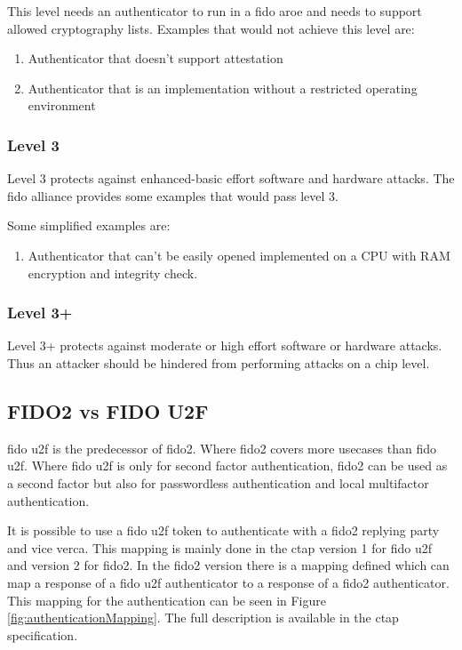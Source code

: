 \documentclass[a4paper, 11pt]{scrartcl}
\begin{document}
This level needs an authenticator to run in a \gls{fido} \gls{aroe} and needs to support allowed cryptography lists. Examples that would not achieve this level are: \cite{fido:authenticator:level2, fido:authenticator:allowedEnvironment}
\begin{enumerate}
  \item Authenticator that doesn't support attestation
  \item Authenticator that is an implementation without a restricted operating environment 
\end{enumerate}

\subsubsection{Level 3}
Level 3 protects against enhanced-basic effort software and hardware attacks. The fido alliance provides some examples that would pass level 3. \cite{fido:authenticator:level3}

Some simplified examples are:
\begin{enumerate}
  \item Authenticator that can't be easily opened implemented on a CPU with RAM encryption and integrity check.
\end{enumerate}

\subsubsection{Level 3+}
Level 3+ protects against moderate or high effort software or hardware attacks. Thus an attacker should be hindered from performing attacks on a chip level. \cite{fido:authenticator:level3_plus}

\subsection{FIDO2 vs FIDO U2F}

\gls{fido} \gls{u2f} is the predecessor of \gls{fido2}. Where \gls{fido2} covers more usecases than \gls{fido} \gls{u2f}. Where \gls{fido} \gls{u2f} is only for second factor authentication, \gls{fido2} can be used as a second factor but also for passwordless authentication and local multifactor authentication. \cite{yubico:whatIsFido2}

It is possible to use a \gls{fido} \gls{u2f} token to authenticate with a \gls{fido2} replying party and vice verca. This mapping is mainly done in the \gls{ctap} version 1 for \gls{fido} \gls{u2f} and version 2 for \gls{fido2}. In the \gls{fido2} version there is a mapping defined which can map a response of a \gls{fido} \gls{u2f} authenticator to a response of a \gls{fido2} authenticator. This mapping for the authentication can be seen in Figure \ref{fig:authenticationMapping}. The full description is available in the \gls{ctap} specification. \cite{yubico:whatIsFido2, ctap:interoperability}
\end{document}
